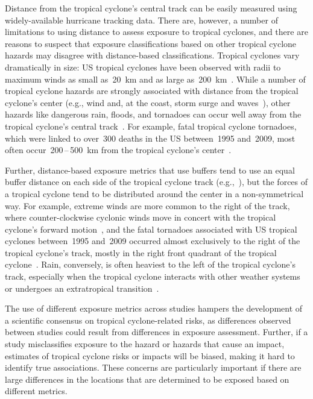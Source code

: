 Distance from the tropical cyclone's central track can be easily measured using
widely-available hurricane tracking data. There are, however, a number of
limitations to using distance to assess exposure to tropical cyclones, and
there are reasons to suspect that exposure classifications based on other
tropical cyclone hazards may disagree with distance-based classifications.
Tropical cyclones vary dramatically in size: \ac{US} tropical cyclones have
been observed with radii to maximum winds as small as~20~\si{\kilo\metre} and as
large as~200~\si{\kilo\metre}~\parencite{mallin2006, quiring2011variations}. While a
number of tropical cyclone hazards are strongly associated with distance from
the tropical cyclone's center (e.g., wind and, at the coast, storm surge and
waves~\parencite{rappaport2000, kruk2010}), other hazards like dangerous rain,
floods, and tornadoes can occur well away from the tropical cyclone's central
track~\parencite{rappaport2000, atallah2007, moore2012}.  For example, fatal
tropical cyclone tornadoes, which were linked to over~300 deaths in the \ac{US}
between~1995 and~2009, most often occur~200\,--\,500~\si{\kilo\metre} from the
tropical cyclone's center~\parencite{moore2012}. 

Further, distance-based exposure metrics that use
buffers tend to use an equal buffer distance on each side of the tropical
cyclone track (e.g.,~\cite{czajkowski2011, grabich2015, grabich2016,
zandbergen2009, tansel2010}), but the forces of a tropical cyclone tend to be
distributed around the center in a non-symmetrical way. For example, extreme
winds are more common to the right of the track, where counter-clockwise
cyclonic winds move in concert with the tropical cyclone's forward 
motion~\parencite{halverson2015}, and the fatal tornadoes associated with \ac{US} tropical
cyclones between~1995 and~2009 occurred almost exclusively to the right of the
tropical cyclone's track, mostly in the right front quadrant of the tropical
cyclone~\parencite{moore2012}. Rain, conversely, is often heaviest to the left of
the tropical cyclone's track, especially when the tropical cyclone interacts
with other weather systems~\parencite{atallah2003, atallah2007, zhu2013variations}
or undergoes an extratropical transition~\parencite{elsberry2002}.


The use of different exposure metrics across studies hampers the development of
a scientific consensus on tropical cyclone-related risks, as differences
observed between studies could result from differences in exposure assessment.
Further, if a study misclassifies exposure to the hazard or hazards that cause
an impact, estimates of tropical cyclone risks or impacts will be biased,
making it hard to identify true associations. These concerns are particularly
important if there are large differences in the locations that are determined
to be exposed based on different metrics.  

